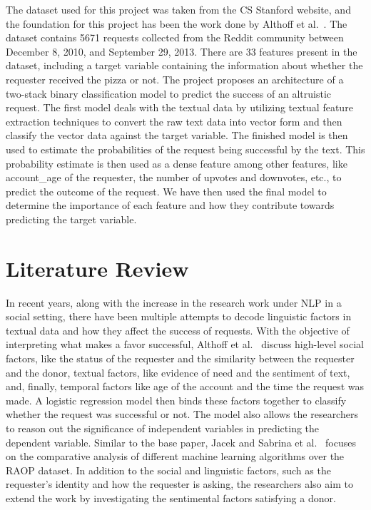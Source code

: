 \documentclass[conference]{IEEEtran}
\begin{document}
The dataset used for this project was taken from the CS Stanford website, and the foundation for this project has been the work done by Althoff et al.~\cite{raop_base}. The dataset contains 5671 requests collected from the Reddit community between December 8, 2010, and September 29, 2013. There are 33 features present in the dataset, including a target variable containing the information about whether the requester received the pizza or not. The project proposes an architecture of a two-stack binary classification model to predict the success of an altruistic request. The first model deals with the textual data by utilizing textual feature extraction techniques to convert the raw text data into vector form and then classify the vector data against the target variable. The finished model is then used to estimate the probabilities of the request being successful by the text. This probability estimate is then used as a dense feature among other features, like account\_age of the requester, the number of upvotes and downvotes, etc., to predict the outcome of the request. We have then used the final model to determine the importance of each feature and how they contribute towards predicting the target variable.

\section{Literature Review}
In recent years, along with the increase in the research work under NLP in a social setting, there have been multiple attempts to decode linguistic factors in textual data and how they affect the success of requests. With the objective of interpreting what makes a favor successful, Althoff et al.~\cite{raop_base} discuss high-level social factors, like the status of the requester and the similarity between the requester and the donor, textual factors, like evidence of need and the sentiment of text, and, finally, temporal factors like age of the account and the time the request was made. A logistic regression model then binds these factors together to classify whether the request was successful or not. The model also allows the researchers to reason out the significance of independent variables in predicting the dependent variable. Similar to the base paper, Jacek and Sabrina et al.~\cite{raop_sent} focuses on the comparative analysis of different machine learning algorithms over the RAOP dataset. In addition to the social and linguistic factors, such as the requester's identity and how the requester is asking, the researchers also aim to extend the work by investigating the sentimental factors satisfying a donor.
\end{document}
